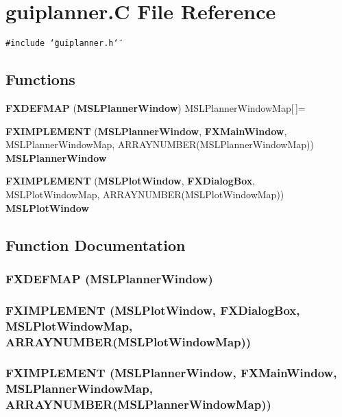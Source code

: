 \section{guiplanner.C File Reference}
\label{guiplanner_C}
{\tt \#include \char`\"{}guiplanner.h\char`\"{}}\par
\subsection*{Functions}
\begin{CompactItemize}
\item 
{\bf FXDEFMAP} ({\bf MSLPlanner\-Window}) MSLPlanner\-Window\-Map[$\,$]=
\item 
{\bf FXIMPLEMENT} ({\bf MSLPlanner\-Window}, {\bf FXMain\-Window}, MSLPlanner\-Window\-Map, ARRAYNUMBER(MSLPlanner\-Window\-Map)) {\bf MSLPlanner\-Window}
\item 
{\bf FXIMPLEMENT} ({\bf MSLPlot\-Window}, {\bf FXDialog\-Box}, MSLPlot\-Window\-Map, ARRAYNUMBER(MSLPlot\-Window\-Map)) {\bf MSLPlot\-Window}
\end{CompactItemize}


\subsection{Function Documentation}
\subsubsection{\setlength{\rightskip}{0pt plus 5cm}FXDEFMAP ({\bf MSLPlanner\-Window})}\label{guiplanner_C_a0}


\subsubsection{\setlength{\rightskip}{0pt plus 5cm}FXIMPLEMENT ({\bf MSLPlot\-Window}, {\bf FXDialog\-Box}, MSLPlot\-Window\-Map, ARRAYNUMBER(MSLPlot\-Window\-Map))}\label{guiplanner_C_a2}


\subsubsection{\setlength{\rightskip}{0pt plus 5cm}FXIMPLEMENT ({\bf MSLPlanner\-Window}, {\bf FXMain\-Window}, MSLPlanner\-Window\-Map, ARRAYNUMBER(MSLPlanner\-Window\-Map))}\label{guiplanner_C_a1}


